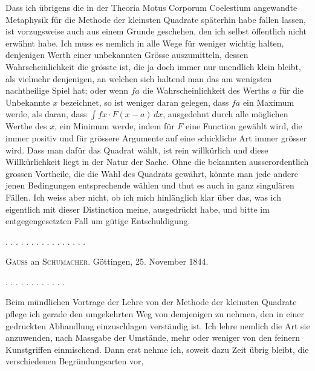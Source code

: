 Dass ich übrigens die in der Theoria Motus Corporum Coelestium angewandte Metaphysik für die Methode der kleinsten Quadrate späterhin habe fallen lassen, ist vorzugsweise auch aus einem Grunde geschehen, den ich selbst öffentlich nicht erwähnt habe. Ich muss es nemlich in alle Wege für weniger wichtig halten, denjenigen Werth einer unbekannten Grösse auszumitteln, dessen Wahrscheinlichkeit die grösste ist, die ja doch immer nur unendlich klein bleibt, als vielmehr denjenigen, an welchen sich haltend man das am wenigsten nachtheilige Spiel hat; oder wenn $fa$ die Wahrscheinlichkeit des Werths $a$ für die Unbekannte $x$ bezeichnet, so ist weniger daran gelegen, dass $fa$ ein Maximum werde, als daran, dass $\int fx \cdot F(x-a)\,dx$, ausgedehnt durch alle möglichen Werthe des $x$, ein Minimum werde, indem für $F$ eine Function gewählt wird, die immer positiv und für grössere Argumente auf eine schickliche Art immer grösser wird. Dass man dafür das Quadrat wählt, ist rein willkürlich und diese Willkürlichkeit liegt in der Natur der Sache. Ohne die bekannten ausserordentlich grossen Vortheile, die die Wahl des Quadrats gewährt, könnte man jede andere jenen Bedingungen entsprechende wählen und thut es auch in ganz singulären Fällen. Ich weiss aber nicht, ob ich mich hinlänglich klar über das, was ich eigentlich mit dieser Distinction meine, ausgedrückt habe, und bitte im entgegengesetzten Fall um gütige Entschuldigung.

. . . . . . . . . . . . . . . .

\begin{center}\textsc{Gauss} an \textsc{Schumacher}. Göttingen, 25. November 1844.\end{center}

. . . . . . . . . . . .

Beim mündlichen Vortrage der Lehre von der Methode der kleinsten Quadrate pflege ich gerade den umgekehrten Weg von demjenigen zu nehmen, den in einer gedruckten Abhandlung einzuschlagen verständig ist. Ich lehre nemlich  die Art sie anzuwenden, nach Massgabe der Umstände, mehr oder weniger von den feinern Kunstgriffen einmischend. Dann erst nehme ich, soweit dazu Zeit übrig bleibt, die verschiedenen Begründungsarten vor,
